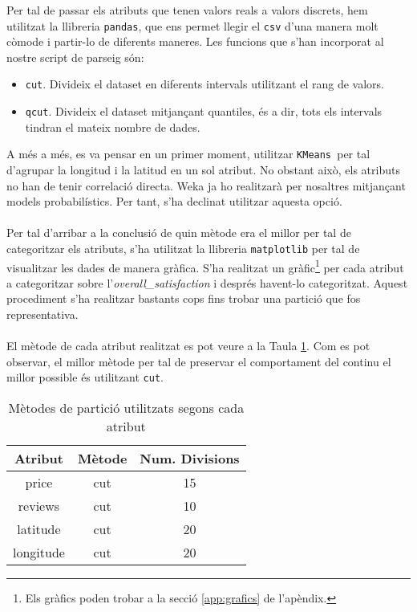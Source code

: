 
\label{sec:partition}

Per tal de passar els atributs que tenen valors reals a valors discrets, hem utilitzat la llibreria \texttt{pandas}, que ens permet llegir el \texttt{csv} d'una manera molt còmode i partir-lo de diferents maneres. Les funcions que s'han incorporat al nostre script de parseig són:
\begin{itemize}
	\item \texttt{cut}. Divideix el dataset en diferents intervals utilitzant el rang de valors.
	\item \texttt{qcut}. Divideix el dataset mitjançant quantiles, és a dir, tots els intervals tindran el mateix nombre de dades.
\end{itemize}
A més a més, es va pensar en un primer moment, utilitzar \texttt{KMeans }per tal d'agrupar la longitud i la latitud en un sol atribut. No obstant això, els atributs no han de tenir correlació directa. Weka ja ho realitzarà per nosaltres mitjançant models probabilístics. Per tant, s'ha declinat utilitzar aquesta opció.
\\\\
Per tal d'arribar a la conclusió de quin mètode era el millor per tal de categoritzar els atributs, s'ha utilitzat la llibreria \texttt{matplotlib} per tal de visualitzar les dades de manera gràfica. S'ha realitzat un gràfic\footnote{Els gràfics poden trobar a la secció \ref{app:grafics} de l'apèndix.} per cada atribut a categoritzar sobre l'\textit{overall\_satisfaction} i després havent-lo categoritzat. Aquest procediment s'ha realitzar bastants cops fins trobar una partició que fos representativa.
\\
\\
El mètode de cada atribut realitzat es pot veure a la Taula \ref{tab:part}. Com es pot observar, el millor mètode per tal de preservar el comportament del continu el millor possible és utilitzant \texttt{cut}.
\begin{table}[H]
	\centering
\begin{tabular}{ccc}
	Atribut &Mètode & Num. Divisions\\\hline
	price & cut & 15 \\
	reviews & cut & 10 \\
	latitude & cut & 20 \\
	longitude & cut & 20 \\
\end{tabular}
\caption{Mètodes de partició utilitzats segons cada atribut}
\label{tab:part}
\end{table}

